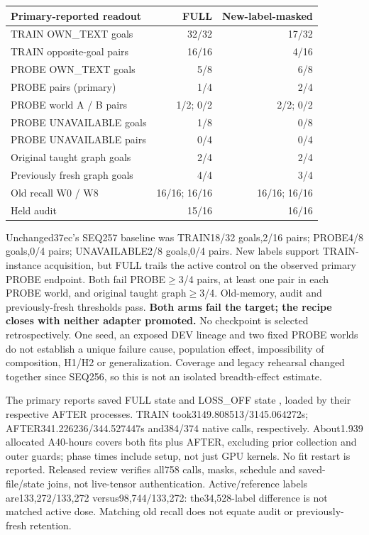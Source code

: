 \documentclass[11pt]{article}
\begin{document}
\begin{center}
\small
\begin{tabular}{lrr}
\toprule
Primary-reported readout & FULL & New-label-masked \\
\midrule
TRAIN OWN\_TEXT goals & 32/32 & 17/32 \\
TRAIN opposite-goal pairs & 16/16 & 4/16 \\
PROBE OWN\_TEXT goals & 5/8 & 6/8 \\
PROBE pairs (primary) & 1/4 & 2/4 \\
PROBE world A / B pairs & 1/2; 0/2 & 2/2; 0/2 \\
PROBE UNAVAILABLE goals & 1/8 & 0/8 \\
PROBE UNAVAILABLE pairs & 0/4 & 0/4 \\
Original taught graph goals & 2/4 & 2/4 \\
Previously fresh graph goals & 4/4 & 3/4 \\
Old recall W0 / W8 & 16/16; 16/16 & 16/16; 16/16 \\
Held audit & 15/16 & 16/16 \\
\bottomrule
\end{tabular}
\end{center}

Unchanged37ec's SEQ257 baseline was TRAIN18/32 goals,2/16 pairs; PROBE4/8
goals,0/4 pairs; UNAVAILABLE2/8 goals,0/4 pairs. New labels support TRAIN-instance
acquisition, but FULL trails the active control on the observed primary PROBE
endpoint. Both fail PROBE$\geq$3/4 pairs, at least one pair in each PROBE world,
and original taught graph$\geq$3/4. Old-memory, audit and previously-fresh
thresholds pass. \textbf{Both arms fail the target; the recipe closes with neither
adapter promoted.} No checkpoint is selected retrospectively. One seed, an
exposed DEV lineage and two fixed PROBE worlds do not establish a unique failure
cause, population effect, impossibility of composition, H1/H2 or generalization.
Coverage and legacy rehearsal changed together since SEQ256, so this is not an
isolated breadth-effect estimate.

The primary reports saved FULL state
and LOSS\_OFF state
,
loaded by their respective AFTER processes. TRAIN took3149.808513/3145.064272s;
AFTER341.226236/344.527447s and384/374 native calls, respectively. About1.939
allocated A40-hours covers both fits plus AFTER, excluding prior collection and
outer guards; phase times include setup, not just GPU kernels. No fit restart
is reported. Released review verifies all758 calls, masks, schedule and
saved-file/state joins, not live-tensor authentication. Active/reference
labels are133,272/133,272 versus98,744/133,272: the34,528-label difference
is not matched active dose. Matching old recall does not equate audit or
previously-fresh retention.
\end{document}

